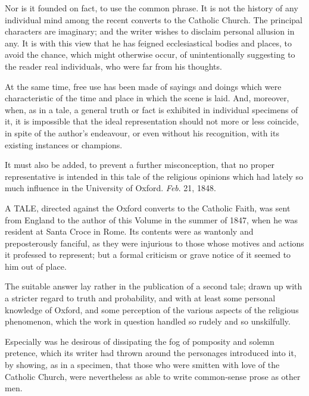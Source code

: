 Nor is it founded on fact, to use the common phrase. It
is not the history of any individual mind among the recent converts to
the Catholic Church. The principal characters are imaginary; and the
writer wishes to disclaim personal allusion in any. It is with this view
that he has feigned ecclesiastical bodies and places, to avoid the
chance, which might otherwise occur, of unintentionally suggesting to
the reader real individuals, who were far from his thoughts.


At the same time, free use has been made of sayings and
doings which were characteristic of the time and place in which the
scene is laid. And, moreover, when, as in a tale, a general truth or
fact is exhibited in individual specimens of it, it is impossible
that the ideal representation should not more or less coincide, in spite
of the author's endeavour, or even without his recognition, with its
existing instances or champions.


It must also be added, to prevent a further
misconception, that no proper representative is intended in this tale of
the religious opinions which had lately so much influence in the
University of Oxford.
\emph{Feb}. 21, 1848.












A TALE, directed against the
Oxford converts to the Catholic Faith, was sent from England to the
author of this Volume in the summer of 1847, when he was resident at
Santa Croce in Rome. Its contents were as wantonly and preposterously
fanciful, as they were injurious to those whose motives and actions it
professed to represent; but a formal criticism or grave notice of it
seemed to him out of place.


The suitable answer lay rather in the publication of a
second tale; drawn up with a stricter regard to truth and probability,
and with at least some personal knowledge of Oxford, and some perception
of the various aspects of the religious phenomenon, which the work in
question handled so rudely and so unskilfully.


Especially was he desirous of dissipating the fog of
pomposity and solemn pretence, which its writer had thrown around the
personages introduced into it, by showing, as in a specimen, that those
who were smitten with love of the Catholic Church, were
nevertheless as able to write common-sense prose as other men.


